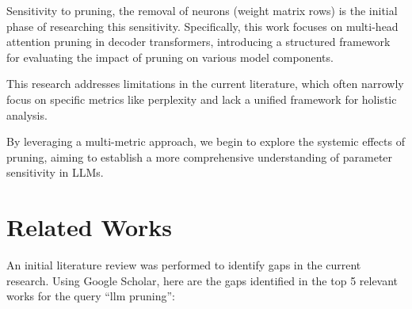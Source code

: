 \documentclass[conference]{IEEEtran}
\begin{document}
    Sensitivity to pruning, the removal of neurons (weight matrix rows) is the initial phase of researching this sensitivity.
    Specifically, this work focuses on multi-head attention pruning in decoder transformers, introducing a structured framework for evaluating the impact of pruning on various model components.

    This research addresses limitations in the current literature, which often narrowly focus on specific metrics like perplexity and lack a unified framework for holistic analysis.

    By leveraging a multi-metric approach, we begin to explore the systemic effects of pruning, aiming to establish a more comprehensive understanding of parameter sensitivity in LLMs.

    \section{Related Works}

    An initial literature review was performed to identify gaps in the current research.
    Using Google Scholar\cite{GoogleScholar}, here are the gaps identified in the top 5 relevant works for the query ``llm pruning'':
\end{document}
